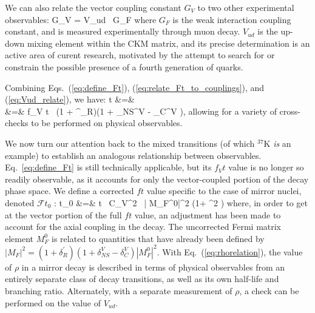 We can also relate the vector coupling constant $G_V$ to two other experimental observables:
\bea
G_V = V_{ud}  \, G_F
\label{eq:Vud_relate}
\eea
where $G_F$ is the weak interaction coupling constant, and is measured experimentally through muon decay.  $V_{ud}$ is the up-down mixing element within the \ac{CKM} matrix, and its precise determination is an active area of curent research, motivated by the attempt to search for or constrain the possible presence of a fourth generation of quarks.

Combining Eqs.~(\ref{eq:define_Ft}), (\ref{eq:relate_Ft_to_couplings}), and (\ref{eq:Vud_relate}), we have:
\bea
{}t &=&  
\nonumber \\
&=& 
f_V t \, (1 + \delta^\prime_R)(1 + \delta_{NS}^V - \delta_C^{V} ), 
\label{eq:Ft_with_Vud}
\eea
allowing for a variety of cross-checks to be performed on physical observables.  

We now turn our attention back to the mixed transitions (of which $^{37}$K \emph{is} an example) to establish an analogous relationship between observables.  Eq.~\ref{eq:define_Ft} is still technically applicable, but its $f_Vt$ value is no longer so readily observable, as it accounts for only the vector-coupled portion of the decay phase space.  We define a corrected $ft$ value specific to the case of mirror nuclei, denoted $\mathcal{F}t_0$ 
\cite{shidling2014}
\cite{naviliat2009april}
\cite{ben_Abeta}:
\bea
{}t_0 &=&  t \, C_V^2 \, | M_F^0|^2 \left(1+ \rho^2 \right)
\label{eq:rhorelation}
\eea
where, in order to get at the vector portion of the full $ft$ value, an adjustment has been made to account for the axial coupling in the decay.  The uncorrected Fermi matrix element $M_F^0$ is related to quantities that have already been defined by $| M_F |^2 =  (1 + \delta^\prime_R)(1 + \delta_{NS}^V - \delta_C^{V} ) | M_F^0 |^2 $.  With Eq.~(\ref{eq:rhorelation}), the value of $\rho$ in a mirror decay is described in terms of physical observables from an entirely separate class of decay transitions, as well as its own half-life and branching ratio.  Alternately, with a separate measurement of $\rho$, a check can be performed on the value of $V_{ud}$.~










